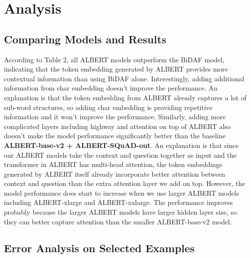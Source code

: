 \documentclass{article}
\begin{document}
\section{Analysis}
\subsection{Comparing Models and Results} \label{results_analysis}
According to Table 2, all ALBERT models outperform the BiDAF model, indicating that the token embedding generated by ALBERT provides more contextual information than using BiDAF alone. Interestingly, adding additional information from char embedding doesn't improve the performance. An explanation is that the token embedding from ALBERT already captures a lot of sub-word structures, so adding char embedding is providing repetitive information and it won't improve the performance. Similarly, adding more complicated layers including highway and attention on top of ALBERT also doesn't make the model performance significantly better than the baseline \textbf{ALBERT-base-v2 + ALBERT-SQuAD-out}. An explanation is that since our ALBERT models take the context and question together as input and the transformer in ALBERT has multi-head attention, the token embeddings generated by ALBERT itself already incorporate better attention between context and question than the extra attention layer we add on top. However, the model performance does start to increase when we use larger ALBERT models including ALBERT-xlarge and ALBERT-xxlarge. The performance improves probably because the larger ALBERT models have larger hidden layer size, so they can better capture attention than the smaller ALBERT-base-v2 model. 

\subsection{Error Analysis on Selected Examples}
\end{document}
